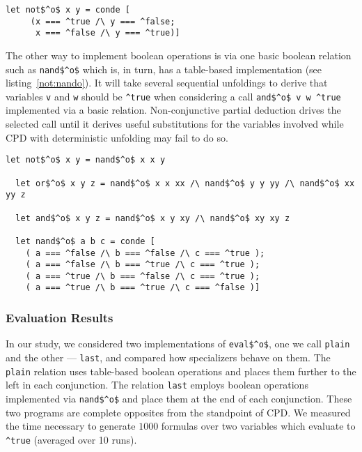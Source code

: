 \begin{figure*}[!h]
  \centering
  \begin{minipage}{0.45\textwidth}
    \begin{lstlisting}[label={not:table}, caption={Implementation of boolean \lstinline{not} as a table}, captionpos=b, frame=tb]
  let not$^o$ x y = conde [
     (x === ^true /\ y === ^false;
      x === ^false /\ y === ^true)]
    \end{lstlisting}
  \end{minipage}
\end{figure*}

The other way to implement boolean operations is via one basic boolean relation such as \lstinline{nand$^o$} which is, in turn, has a table-based implementation (see listing~\ref{not:nando}).
It will take several sequential unfoldings to derive that variables \lstinline{v} and \lstinline{w} should be \lstinline{^true} when considering a call \lstinline{and$^o$ v w ^true} implemented via a basic relation.
Non-conjunctive partial deduction drives the selected call until it derives useful substitutions for the variables involved while CPD with deterministic unfolding may fail to do so.

\begin{figure*}[!h]
  \centering
  \begin{minipage}{0.85\textwidth}
    \begin{lstlisting}[label={not:nando}, caption={Implementation of boolean operation via \lstinline{nand}}, captionpos=b, frame=tb]
  let not$^o$ x y = nand$^o$ x x y

  let or$^o$ x y z = nand$^o$ x x xx /\ nand$^o$ y y yy /\ nand$^o$ xx yy z

  let and$^o$ x y z = nand$^o$ x y xy /\ nand$^o$ xy xy z

  let nand$^o$ a b c = conde [
    ( a === ^false /\ b === ^false /\ c === ^true );
    ( a === ^false /\ b === ^true /\ c === ^true );
    ( a === ^true /\ b === ^false /\ c === ^true );
    ( a === ^true /\ b === ^true /\ c === ^false )]
    \end{lstlisting}
  \end{minipage}
\end{figure*}

\subsubsection{Evaluation Results}
In our study, we considered two implementations of \lstinline{eval$^o$}, one we call \lstinline{plain} and the other --- \lstinline{last}, and compared how specializers behave on them.
The \lstinline{plain} relation uses table-based boolean operations and places them further to the left in each conjunction.
The relation \lstinline{last} employs boolean operations implemented via \lstinline{nand$^o$} and place them at the end of each conjunction.
These two programs are complete opposites from the standpoint of CPD.
We measured the time necessary to generate $1000$ formulas over two variables which evaluate to \lstinline{^true} (averaged over 10 runs).



